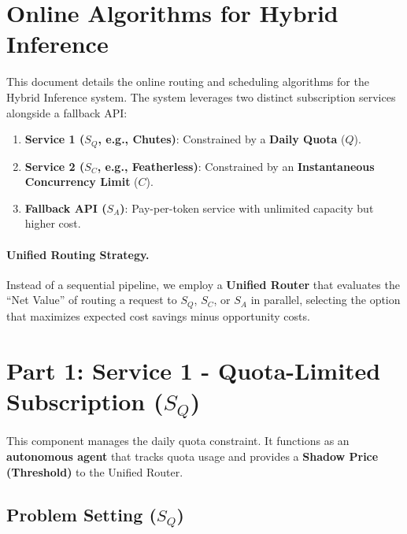 \documentclass[11pt]{article}
\begin{document}
\section{Online Algorithms for Hybrid Inference}
\label{sec:online}

This document details the online routing and scheduling algorithms for the Hybrid Inference system. The system leverages two distinct subscription services alongside a fallback API:

\begin{enumerate}
  \item \textbf{Service 1 ($S_Q$, e.g., Chutes)}: Constrained by a \textbf{Daily Quota} ($Q$).
  \item \textbf{Service 2 ($S_C$, e.g., Featherless)}: Constrained by an \textbf{Instantaneous Concurrency Limit} ($C$).
  \item \textbf{Fallback API ($S_A$)}: Pay-per-token service with unlimited capacity but higher cost.
\end{enumerate}

\paragraph{Unified Routing Strategy.}
Instead of a sequential pipeline, we employ a \textbf{Unified Router} that evaluates the ``Net Value'' of routing a request to $S_Q$, $S_C$, or $S_A$ in parallel, selecting the option that maximizes expected cost savings minus opportunity costs.

\section{Part 1: Service 1 - Quota-Limited Subscription ($S_Q$)}
\label{sec:part1}

This component manages the daily quota constraint. It functions as an \textbf{autonomous agent} that tracks quota usage and provides a \textbf{Shadow Price (Threshold)} to the Unified Router.

\subsection{Problem Setting ($S_Q$)}
\end{document}
